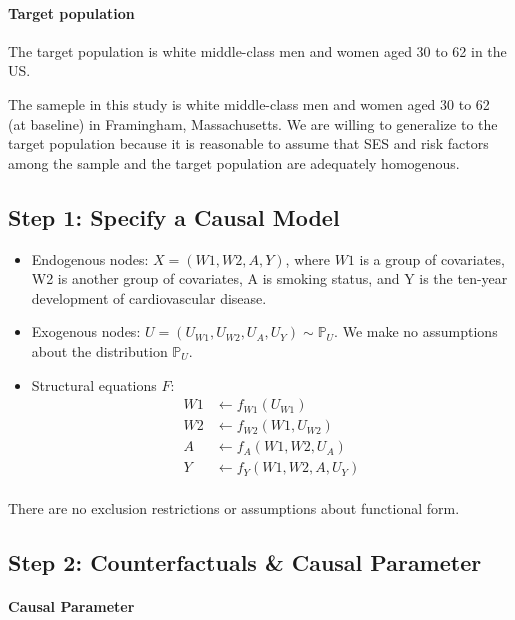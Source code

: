 \documentclass[]{article}
\let\oldparagraph\paragraph
\renewcommand{\paragraph}[1]{\oldparagraph{#1}\mbox{}}
\begin{document}
\paragraph{Target population}\label{target-population}

The target population is white middle-class men and women aged 30 to 62
in the US.

The sameple in this study is white middle-class men and women aged 30 to
62 (at baseline) in Framingham, Massachusetts. We are willing to
generalize to the target population because it is reasonable to assume
that SES and risk factors among the sample and the target population are
adequately homogenous.

\subsection{Step 1: Specify a Causal
Model}\label{step-1-specify-a-causal-model}

\begin{itemize}
\item
  Endogenous nodes: \(X = (W1,W2,A,Y)\), where \(W1\) is a group of
  covariates, W2 is another group of covariates, A is smoking status,
  and Y is the ten-year development of cardiovascular disease.
\item
  Exogenous nodes:
  \(U = (U_{W1}, U_{W2}, U_A , U_Y) \sim \mathbb{P}_U\). We make no
  assumptions about the distribution \(\mathbb{P}_U\).
\item
  Structural equations \(F\): \[
  \begin{aligned}
  W1 &\leftarrow  f_{W1}(U_{W1})\\
  W2 &\leftarrow  f_{W2}(W1,U_{W2})\\
  A  &\leftarrow f_A(W1,W2,U_A)\\
  Y  &\leftarrow f_Y(W1,W2,A,U_Y)\\
  \end{aligned}
  \]
\end{itemize}

There are no exclusion restrictions or assumptions about functional
form.

\subsection{Step 2: Counterfactuals \& Causal
Parameter}\label{step-2-counterfactuals-causal-parameter}

\paragraph{Causal Parameter}\label{causal-parameter}
\end{document}
